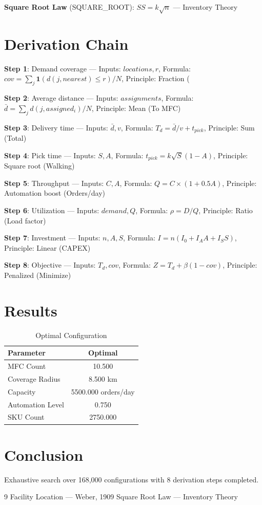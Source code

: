 \documentclass[11pt,twocolumn]{article}
\begin{document}
\textbf{Square Root Law} (SQUARE_ROOT): $SS = k\sqrt{n}$ --- Inventory Theory


\section{Derivation Chain}
\textbf{Step 1}: Demand coverage --- Inputs: $locations, r$, Formula: $cov = \sum_j \mathbf{1}(d(j, nearest) \leq r) / N$, Principle: Fraction (%


\textbf{Step 2}: Average distance --- Inputs: $assignments$, Formula: $\bar{d} = \sum_j d(j, assigned_i) / N$, Principle: Mean (To MFC)


\textbf{Step 3}: Delivery time --- Inputs: $\bar{d}, v$, Formula: $T_d = \bar{d}/v + t_{pick}$, Principle: Sum (Total)


\textbf{Step 4}: Pick time --- Inputs: $S, A$, Formula: $t_{pick} = k \sqrt{S} (1-A)$, Principle: Square root (Walking)


\textbf{Step 5}: Throughput --- Inputs: $C, A$, Formula: $Q = C \times (1 + 0.5A)$, Principle: Automation boost (Orders/day)


\textbf{Step 6}: Utilization --- Inputs: $demand, Q$, Formula: $\rho = D/Q$, Principle: Ratio (Load factor)


\textbf{Step 7}: Investment --- Inputs: $n, A, S$, Formula: $I = n(I_0 + I_A A + I_S S)$, Principle: Linear (CAPEX)


\textbf{Step 8}: Objective --- Inputs: $T_d, cov$, Formula: $Z = T_d + \beta(1-cov)$, Principle: Penalized (Minimize)


\section{Results}
\begin{table}[h]
\centering
\caption{Optimal Configuration}
\begin{tabular}{@{}lc@{}}
\toprule
Parameter & Optimal \\
\midrule
MFC Count & 10.500  \\
Coverage Radius & 8.500 km \\
Capacity & 5500.000 orders/day \\
Automation Level & 0.750  \\
SKU Count & 2750.000  \\
\bottomrule
\end{tabular}
\end{table}

\section{Conclusion}
Exhaustive search over 168,000 configurations with 8 derivation steps completed.

\begin{thebibliography}{9}
 Facility Location --- Weber, 1909
 Square Root Law --- Inventory Theory
\end{thebibliography}
\end{document}

